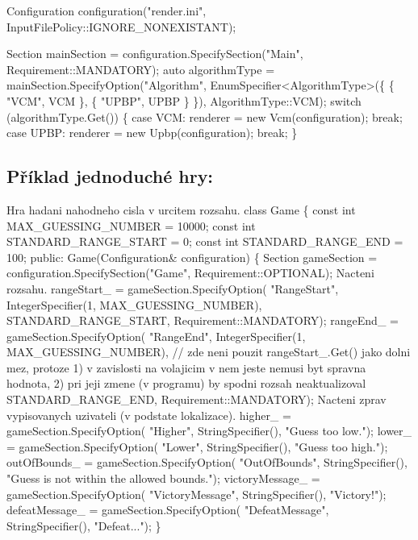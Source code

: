 \begin{DoxyPre}{\ttfamily Configuration configuration("render.ini", InputFilePolicy::IGNORE\_NONEXISTANT);}\end{DoxyPre}



\begin{DoxyPre}{\ttfamily Section mainSection = configuration.SpecifySection("Main", Requirement::MANDATORY);
auto algorithmType = mainSection.SpecifyOption("Algorithm", EnumSpecifier<AlgorithmType>(\{ \{ "VCM", VCM \}, \{ "UPBP", UPBP \} \}), AlgorithmType::VCM);
switch (algorithmType.Get())
\{
    case VCM: renderer = new Vcm(configuration); break;
    case UPBP: renderer = new Upbp(configuration); break;
\}
}\end{DoxyPre}




\subsection*{Příklad jednoduché hry\+:}


\begin{DoxyPre}{\ttfamily 
Hra hadani nahodneho cisla v urcitem rozsahu. 
class Game
\{
    const int MAX\_GUESSING\_NUMBER = 10000;
    const int STANDARD\_RANGE\_START = 0;
    const int STANDARD\_RANGE\_END = 100;
public:
    Game(Configuration& configuration)
    \{
        Section gameSection = configuration.SpecifySection("Game", Requirement::OPTIONAL);
Nacteni rozsahu.
        rangeStart\_ = gameSection.SpecifyOption(
            "RangeStart",
            IntegerSpecifier(1, MAX\_GUESSING\_NUMBER),
            STANDARD\_RANGE\_START,
            Requirement::MANDATORY);
        rangeEnd\_ = gameSection.SpecifyOption(
            "RangeEnd",
            IntegerSpecifier(1, MAX\_GUESSING\_NUMBER), // zde neni pouzit rangeStart\_.Get() jako dolni mez, protoze 1) v zavislosti na volajicim v nem jeste nemusi byt spravna hodnota, 2) pri jeji zmene (v programu) by spodni rozsah neaktualizoval
            STANDARD\_RANGE\_END,
            Requirement::MANDATORY);
Nacteni zprav vypisovanych uzivateli (v podstate lokalizace).
        higher\_ = gameSection.SpecifyOption(
            "Higher",
            StringSpecifier(),
            "Guess too low.");
        lower\_ = gameSection.SpecifyOption(
            "Lower",
            StringSpecifier(),
            "Guess too high.");
        outOfBounds\_ = gameSection.SpecifyOption(
            "OutOfBounds",
            StringSpecifier(),
            "Guess is not within the allowed bounds.");
        victoryMessage\_ = gameSection.SpecifyOption(
            "VictoryMessage",
            StringSpecifier(),
            "Victory!");
        defeatMessage\_ = gameSection.SpecifyOption(
            "DefeatMessage",
            StringSpecifier(),
            "Defeat...");
    \}}\end{DoxyPre}



